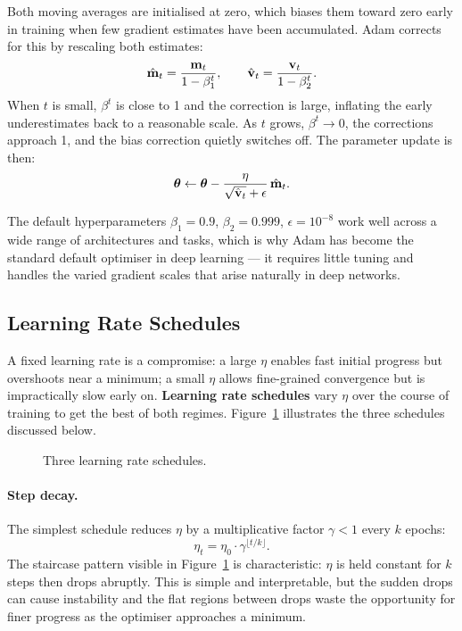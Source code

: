 Both moving averages are initialised at zero, which biases them toward zero early in training when few gradient estimates have been accumulated. Adam corrects for this by rescaling both estimates:
\begin{equation}
    \hat{\mathbf{m}}_t = \frac{\mathbf{m}_t}{1-\beta_1^t}, \qquad \hat{\mathbf{v}}_t = \frac{\mathbf{v}_t}{1-\beta_2^t}.
    \label{eq:adam_bias_correction}
\end{equation}
When $t$ is small, $\beta^t$ is close to 1 and the correction is large, inflating the early underestimates back to a reasonable scale. As $t$ grows, $\beta^t \to 0$, the corrections approach 1, and the bias correction quietly switches off. The parameter update is then:
\begin{equation}
    \boldsymbol{\theta} \leftarrow \boldsymbol{\theta} - \frac{\eta}{\sqrt{\hat{\mathbf{v}}_t} + \epsilon}\, \hat{\mathbf{m}}_t.
    \label{eq:adam_update}
\end{equation}

The default hyperparameters $\beta_1 = 0.9$, $\beta_2 = 0.999$, $\epsilon = 10^{-8}$ work well across a wide range of architectures and tasks, which is why Adam has become the standard default optimiser in deep learning — it requires little tuning and handles the varied gradient scales that arise naturally in deep networks.

\subsection{Learning Rate Schedules}

A fixed learning rate is a compromise: a large $\eta$ enables fast initial progress but overshoots near a minimum; a small $\eta$ allows fine-grained convergence but is impractically slow early on. \textbf{Learning rate schedules} vary $\eta$ over the course of training to get the best of both regimes. Figure~\ref{fig:lr_schedules} illustrates the three schedules discussed below.

\begin{figure}
\centering
\vspace{-0.5em}
\resizebox{0.43\textwidth}{!}{}
\caption{Three learning rate schedules.}
\label{fig:lr_schedules}
\end{figure}

\paragraph{Step decay.} The simplest schedule reduces $\eta$ by a multiplicative factor $\gamma < 1$ every $k$ epochs:
\begin{equation}
    \eta_t = \eta_0 \cdot \gamma^{\lfloor t/k \rfloor}.
\end{equation}
The staircase pattern visible in Figure~\ref{fig:lr_schedules} is characteristic: $\eta$ is held constant for $k$ steps then drops abruptly. This is simple and interpretable, but the sudden drops can cause instability and the flat regions between drops waste the opportunity for finer progress as the optimiser approaches a minimum.

